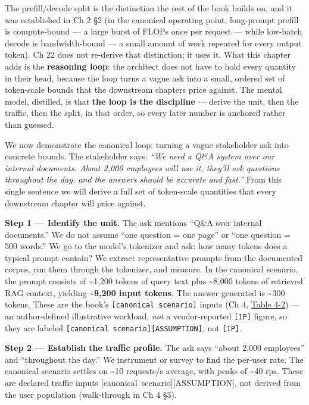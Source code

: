 \label{mental-model}


The prefill/decode split is the distinction the rest of the book builds
on, and it was established in Ch 2 §2 (in the canonical operating point,
long-prompt prefill is compute-bound --- a large burst of FLOPs once per
request --- while low-batch decode is bandwidth-bound --- a small amount
of work repeated for every output token). Ch 22 does not re-derive that
distinction; it uses it. What this chapter adds is the \textbf{reasoning
loop}: the architect does not have to hold every quantity in their head,
because the loop turns a vague ask into a small, ordered set of
token-scale bounds that the downstream chapters price against. The
mental model, distilled, is that \textbf{the loop is the discipline} ---
derive the unit, then the traffic, then the split, in that order, so
every later number is anchored rather than guessed.

\label{worked-example-the-canonical-loop}


We now demonstrate the canonical loop: turning a vague stakeholder ask
into concrete bounds. The stakeholder says: \emph{``We need a Q\&A
system over our internal documents. About 2,000 employees will use it,
they'll ask questions throughout the day, and the answers should be
accurate and fast.''} From this single sentence we will derive a full
set of token-scale quantities that every downstream chapter will price
against.

\textbf{Step 1 --- Identify the unit.} The ask mentions ``Q\&A over
internal documents.'' We do not assume ``one question = one page'' or
``one question = 500 words.'' We go to the model's tokenizer and ask:
how many tokens does a typical prompt contain? We extract representative
prompts from the documented corpus, run them through the tokenizer, and
measure. In the canonical scenario, the prompt consists of
\textasciitilde1,200 tokens of query text plus \textasciitilde8,000
tokens of retrieved RAG context, yielding \textbf{\textasciitilde9,200
input tokens}. The answer generated is \textasciitilde300 tokens. These
are the book's \texttt{{[}canonical\ scenario{]}} inputs (Ch 4, \hyperref[tab:4.2]{Table 4-2}) --- an author-defined illustrative workload, \emph{not} a
vendor-reported \texttt{\mbox{{[}1P{]}}} figure, so they are labeled
\texttt{{[}canonical\ scenario{]}\mbox{{[}ASSUMPTION{]}}}, not
\texttt{\mbox{{[}1P{]}}}.

\textbf{Step 2 --- Establish the traffic profile.} The ask says ``about
2,000 employees'' and ``throughout the day.'' We instrument or survey to
find the per-user rate. The canonical scenario settles on
\textasciitilde10 requests/s average, with peaks of \textasciitilde40
rps. These are declared traffic inputs \mbox{{[}canonical
scenario{]}}\hspace{0pt}\mbox{{[}ASSUMPTION{]}}, not derived from the user population
(walk-through in Ch 4 §3).

